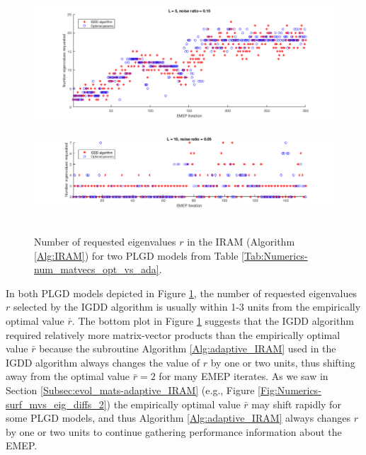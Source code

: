 \begin{figure}[H]
\centering
\hbox{\hspace{-1.0cm} \includegraphics[scale=0.6]{Numerics-num_eigs_ada_vs_opt_1_IGDD} }\vspace{0.6cm}
\hbox{\hspace{-1.0cm} \includegraphics[scale=0.6]{Numerics-num_eigs_ada_vs_opt_2_IGDD} }
\vspace{0.2cm}
	\caption{
	Number of requested eigenvalues $r$ in the IRAM (Algorithm \ref{Alg:IRAM}) for two PLGD models from Table \ref{Tab:Numerics-num_matvecs_opt_vs_ada}.
	}
\label{Fig:Numerics-num_eigs_ada_vs_opt}
\end{figure}


In both PLGD models depicted in Figure \ref{Fig:Numerics-num_eigs_ada_vs_opt}, the number of requested eigenvalues $r$ selected by the IGDD algorithm is usually within 1-3 units from the empirically optimal value $\bar{r}$.
The bottom plot in Figure \ref{Fig:Numerics-num_eigs_ada_vs_opt} suggests that the IGDD algorithm required relatively more matrix-vector products than the empirically optimal value $\bar{r}$ because the subroutine Algorithm \ref{Alg:adaptive_IRAM} used in the IGDD algorithm always changes the value of $r$ by one or two units, thus shifting away from the optimal value $\bar{r}=2$ for many EMEP iterates.
As we saw in Section \ref{Subsec:evol_mats-adaptive_IRAM} (e.g., Figure \ref{Fig:Numerics-surf_mvs_eig_diffs_2}) the empirically optimal value $\bar{r}$ may shift rapidly for some PLGD models, and thus Algorithm \ref{Alg:adaptive_IRAM} always changes $r$ by one or two units to continue gathering performance information about the EMEP.





